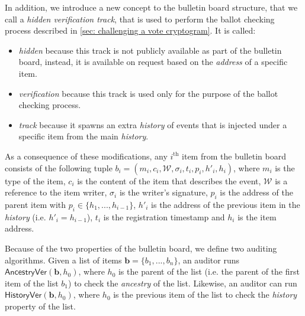 In addition, we introduce a new concept to the bulletin board structure, that we call a \emph{hidden verification track}, that is used to perform the ballot checking process described in \cref{sec: challenging a vote cryptogram}. It is called:
\begin{itemize}
    \item \emph{hidden} because this track is not publicly available as part of the bulletin board, instead, it is available on request based on the \textit{address} of a specific item.
    \item \textit{verification} because this track is used only for the purpose of the ballot checking process.
    \item \emph{track} because it spawns an extra \textit{history} of events that is injected under a specific item from the main \textit{history}.
\end{itemize}

As a consequence of these modifications, any $i^\mathrm{th}$ item from the bulletin board consists of the following tuple $b_i = (m_i, c_i, \mathcal{W}, \sigma_i, t_i, p_i, h'_i, h_i)$, where $m_i$ is the type of the item, $c_i$ is the content of the item that describes the event, $\mathcal{W}$ is a reference to the item writer, $\sigma_i$ is the writer's signature, $p_i$ is the address of the parent item with $p_i \in \{h_1, ..., h_{i-1}\}$, $h'_i$ is the address of the previous item in the \textit{history} (i.e. $h'_i = h_{i-1}$), $t_i$ is the registration timestamp and $h_i$ is the item address.

Because of the two properties of the bulletin board, we define two auditing algorithms. Given a list of items $\boldsymbol{b} = \{ b_1, ..., b_n \}$, an auditor runs $\mathsf{AncestryVer}(\boldsymbol{b}, h_0)$, where $h_0$ is the parent of the list (i.e. the parent of the first item of the list $b_1$) to check the \textit{ancestry} of the list. Likewise, an auditor can run $\mathsf{HistoryVer}(\boldsymbol{b}, h_0)$, where $h_0$ is the previous item of the list to check the \textit{history} property of the list.

\begin{algorithm}[ht]
    \DontPrintSemicolon
    \caption{$\mathsf{AncestryVer}(\boldsymbol{b}, h_0)$}

     
    \label{alg: ancestry ver}
\end{algorithm}

